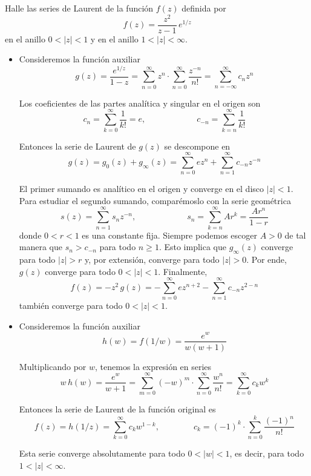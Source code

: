 \begin{exercise}
Halle las series de Laurent de la función $f(z)$ definida por
$$f(z) = \frac {z^2} {z-1} \, e^{1/z}$$
en el anillo $0 < |z| < 1$ y en el anillo $1 < |z| < \infty$.
\end{exercise}

\begin{solution}
\leavevmode
\begin{itemize}
    \item Consideremos la función auxiliar
    $$
    g(z)
        = \frac {e^{1/z}} {1-z}
        = \sum_{n=0}^\infty z^n \cdot \sum_{n=0}^\infty \frac {z^{-n}} {n!}
        = \sum_{n=-\infty}^\infty c_n z^n
    $$
    
    Los coeficientes de las partes analítica y singular en el origen son
    $$
    c_n = \sum_{k=0}^\infty \frac 1 {k!} = e, \qquad \qquad \qquad
    c_{-n} = \sum_{k=n}^\infty \frac 1 {k!}
    $$
    
    Entonces la serie de Laurent de $g(z)$ se descompone en
    $$g(z) = g_0(z) + g_\infty(z) = \sum_{n=0}^\infty ez^n + \sum_{n=1}^\infty c_{-n} z^{-n}$$
    
    El primer sumando es analítico en el origen y converge en el disco $|z| < 1$. Para estudiar el segundo sumando, comparémoslo con la serie geométrica
    $$s(z) = \sum_{n=1}^\infty s_n z^{-n}, \qquad \qquad \qquad s_n = \sum_{k=n}^\infty Ar^k = \frac {Ar^n} {1-r}$$
    donde $0 < r < 1$ es una constante fija. Siempre podemos escoger $A > 0$ de tal manera que $s_n > c_{-n}$ para todo $n \ge 1$. Esto implica que $g_\infty(z)$ converge para todo $|z| > r$ y, por extensión, converge para todo $|z| > 0$. Por ende, $g(z)$ converge para todo $0 < |z| < 1$. Finalmente,
    $$f(z) = -z^2 \, g(z) = -\sum_{n=0}^\infty ez^{n+2} - \sum_{n=1}^\infty c_{-n} z^{2-n}$$
    también converge para todo $0 < |z| < 1$.
    
    \item Consideremos la función auxiliar
    $$h(w) = f(1/w) = \frac {e^w} {w (w+1)}$$
    
    Multiplicando por $w$, tenemos la expresión en series
    $$
    w \, h(w)
        = \frac {e^w} {w+1}
        = \sum_{m=0}^\infty (-w)^m \cdot \sum_{n=0}^\infty \frac {w^n} {n!}
        = \sum_{k=0}^\infty c_k w^k
    $$
    
    Entonces la serie de Laurent de la función original es
    $$
    f(z) = h(1/z) = \sum_{k=0}^\infty c_k w^{1-k}, \qquad \qquad
    c_k = (-1)^k \cdot \sum_{n=0}^k \frac {(-1)^n} {n!}
    $$
    
    Esta serie converge absolutamente para todo $0 < |w| < 1$, es decir, para todo $1 < |z| < \infty$.
\end{itemize}
\end{solution}
